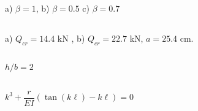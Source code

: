 a) $\beta = 1$, b) $\beta = 0.5$ c) $\beta = 0.7$

\subsection{}

a) $Q_{cr} = 14.4 $ kN ,  b) $Q_{cr} = 22.7 $ kN, $a=25.4$ cm.



\subsection{}
$h/b = 2$

\subsection{}
$k^3 + \dfrac{r}{EI} \left( \tan(k\ell)-k\ell \right) = 0 $
